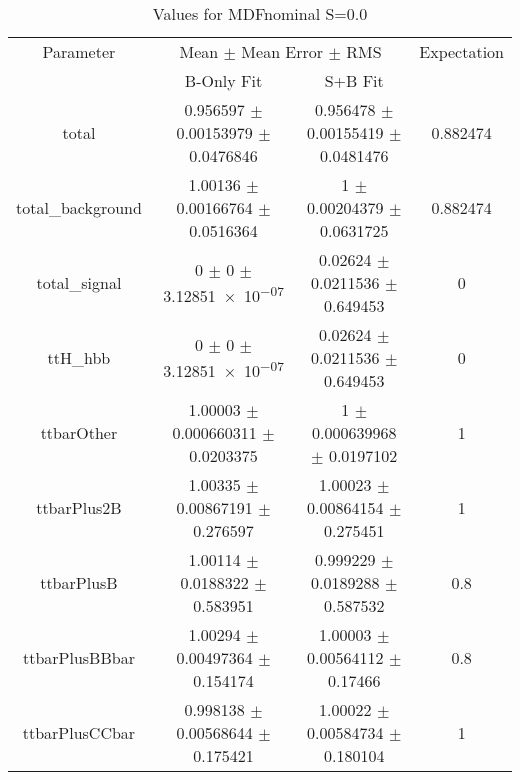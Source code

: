 \begin{table}
\centering
\caption{Values for MDFnominal S=0.0}
\begin{tabular}{cccc}
\toprule
Parameter & \multicolumn{2}{c}{Mean $\pm$ Mean Error $\pm$ RMS} & Expectation\\
 & B-Only Fit & S+B Fit & \\
\midrule
total & \num{0.956597} $\pm$ \num{0.00153979} $\pm$ \num{0.0476846} & \num{0.956478} $\pm$ \num{0.00155419} $\pm$ \num{0.0481476} & \num{0.882474}\\
total\_background & \num{1.00136} $\pm$ \num{0.00166764} $\pm$ \num{0.0516364} & \num{1} $\pm$ \num{0.00204379} $\pm$ \num{0.0631725} & \num{0.882474}\\
total\_signal & \num{0} $\pm$ \num{0} $\pm$ \num{3.12851e-07} & \num{0.02624} $\pm$ \num{0.0211536} $\pm$ \num{0.649453} & \num{0}\\
ttH\_hbb & \num{0} $\pm$ \num{0} $\pm$ \num{3.12851e-07} & \num{0.02624} $\pm$ \num{0.0211536} $\pm$ \num{0.649453} & \num{0}\\
ttbarOther & \num{1.00003} $\pm$ \num{0.000660311} $\pm$ \num{0.0203375} & \num{1} $\pm$ \num{0.000639968} $\pm$ \num{0.0197102} & \num{1}\\
ttbarPlus2B & \num{1.00335} $\pm$ \num{0.00867191} $\pm$ \num{0.276597} & \num{1.00023} $\pm$ \num{0.00864154} $\pm$ \num{0.275451} & \num{1}\\
ttbarPlusB & \num{1.00114} $\pm$ \num{0.0188322} $\pm$ \num{0.583951} & \num{0.999229} $\pm$ \num{0.0189288} $\pm$ \num{0.587532} & \num{0.8}\\
ttbarPlusBBbar & \num{1.00294} $\pm$ \num{0.00497364} $\pm$ \num{0.154174} & \num{1.00003} $\pm$ \num{0.00564112} $\pm$ \num{0.17466} & \num{0.8}\\
ttbarPlusCCbar & \num{0.998138} $\pm$ \num{0.00568644} $\pm$ \num{0.175421} & \num{1.00022} $\pm$ \num{0.00584734} $\pm$ \num{0.180104} & \num{1}\\
\bottomrule
\end{tabular}
\end{table}